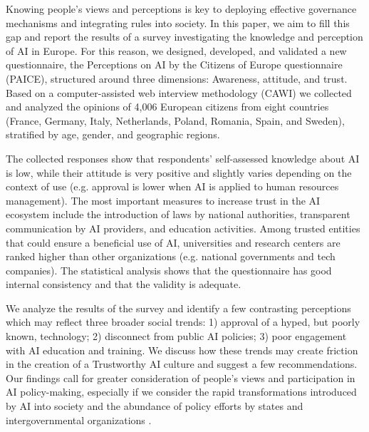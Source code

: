 \documentclass{article}
\begin{document}
Knowing people's views and perceptions is key to deploying effective governance mechanisms and integrating rules into society. In this paper, we aim to fill this gap and report the results of a survey investigating the knowledge and perception of AI in Europe. For this reason, we designed, developed, and validated a new questionnaire, the Perceptions on AI by the Citizens of Europe questionnaire (PAICE), structured around three dimensions: Awareness, attitude, and trust. Based on a computer-assisted web interview methodology (CAWI) we collected and analyzed the opinions of 4,006 European citizens from eight countries (France, Germany, Italy, Netherlands, Poland, Romania, Spain, and Sweden), stratified by age, gender, and geographic regions.

The collected responses show that respondents' self-assessed knowledge about AI is low, while their attitude is very positive and slightly varies depending on the context of use (e.g. approval is lower when AI is applied to human resources management). The most important measures to increase trust in the AI ecosystem include the introduction of laws by national authorities, transparent communication by AI providers, and education activities. Among trusted entities that could ensure a beneficial use of AI, universities and research centers are ranked higher than other organizations (e.g. national governments and tech companies). The statistical analysis shows that the questionnaire has good internal consistency and that the validity is adequate.

We analyze the results of the survey and identify a few contrasting perceptions which may reflect three broader social trends: 1) approval of a hyped, but poorly known, technology; 2) disconnect from public AI policies; 3) poor engagement with AI education and training. We discuss how these trends may create friction in the creation of a Trustworthy AI culture and suggest a few recommendations. Our findings call for greater consideration of people's views and participation in AI policy-making, especially if we consider the rapid transformations introduced by AI into society and the abundance of policy efforts by states and intergovernmental organizations \cite{oecdAI, ai_act, cheng2022shaping, AlgoAct, AfricaAI, simbeck2022facct}. 

\end{document}
